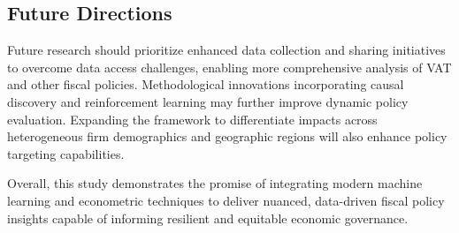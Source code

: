 \subsection{Future Directions}
Future research should prioritize enhanced data collection and sharing initiatives to overcome data access challenges, enabling more comprehensive analysis of VAT and other fiscal policies. Methodological innovations incorporating causal discovery and reinforcement learning may further improve dynamic policy evaluation. Expanding the framework to differentiate impacts across heterogeneous firm demographics and geographic regions will also enhance policy targeting capabilities.

Overall, this study demonstrates the promise of integrating modern machine learning and econometric techniques to deliver nuanced, data-driven fiscal policy insights capable of informing resilient and equitable economic governance.
